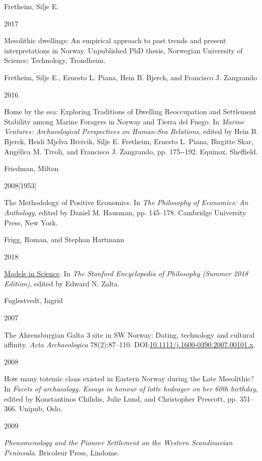 \documentclass[
  12pt,
  a4paper,
  oneside]{book}
\newlength{\cslhangindent}
\newlength{\csllabelwidth}
\newlength{\cslentryspacingunit} %
\newenvironment{CSLReferences}[2] %
 {%
  \setlength{\parindent}{0pt}
  \ifodd #1
  \let\oldpar\par
  \def\par{\hangindent=\cslhangindent\oldpar}
  \fi
  \setlength{\parskip}{#2\cslentryspacingunit}
 }%
 {}
\newcommand{\CSLBlock}[1]{#1\hfill\break}
\newcommand{\CSLLeftMargin}[1]{\parbox[t]{\csllabelwidth}{#1}}
\newcommand{\CSLRightInline}[1]{\parbox[t]{\linewidth - \csllabelwidth}{#1}\break}
\begin{document}
\begin{CSLReferences}{0}{0}
\leavevmode{}%
\CSLBlock{Fretheim, Silje E.}
\CSLLeftMargin{ 2017}
\CSLRightInline{{Mesolithic dwellings: An empirical approach to past trends and present interpretations in Norway}. Unpublished PhD thesis, Norwegian University of Science; Technology, Trondheim.}

\leavevmode{}%
\CSLBlock{Fretheim, Silje E., Ernesto L. Piana, Hein B. Bjerck, and Francisco J. Zangrando}
\CSLLeftMargin{ 2016}
\CSLRightInline{{Home by the sea: Exploring Traditions of Dwelling Reoccupation and Settlement Stability among Marine Foragers in Norway and Tierra del Fuego}. In \emph{{Marine Ventures: Archaeological Perspectives on Human-Sea Relations}}, edited by Hein B. Bjerck, Heidi Mjelva Breivik, Silje E. Fretheim, Ernesto L. Piana, Birgitte Skar, Angélica M. Tivoli, and Francisco J. Zangrando, pp. 175-\/-192. Equinox, Sheffield.}

\leavevmode{}%
\CSLBlock{Friedman, Milton}
\CSLLeftMargin{ 2008{[}1953{]}}
\CSLRightInline{{The Methodology of Positive Economics}. In \emph{{The Philosophy of Economics: An Anthology}}, edited by Daniel M. Hausman, pp. 145--178. Cambridge University Press, New York.}

\leavevmode{}%
\CSLBlock{Frigg, Roman, and Stephan Hartmann}
\CSLLeftMargin{ 2018}
\CSLRightInline{\href{https://plato.stanford.edu/archives/sum2018/entries/models-science/}{{Models in Science}}. In \emph{{The Stanford Encyclopedia of Philosophy (Summer 2018 Edition)}}, edited by Edward N. Zalta.}

\leavevmode{}%
\CSLBlock{Fuglestvedt, Ingrid}
\CSLLeftMargin{ 2007}
\CSLRightInline{{The Ahrensburgian Galta 3 site in SW Norway: Dating, technology and cultural affinity}. \emph{Acta Archaeologica} 78(2):87--110. DOI:\href{https://doi.org/10.1111/j.1600-0390.2007.00101.x}{10.1111/j.1600-0390.2007.00101.x}.}

\leavevmode{}%
\CSLLeftMargin{ 2008 }
\CSLRightInline{{How many totemic clans existed in Eastern Norway during the Late Mesolithic?} In \emph{Facets of archaeology. Essays in honour of lotte hedeager on her 60th birthday}, edited by Konstantinos Chilidis, Julie Lund, and Christopher Prescott, pp. 351--366. Unipub, Oslo.}

\leavevmode{}%
\CSLLeftMargin{ 2009 }
\CSLRightInline{\emph{{Phenomenology and the Pioneer Settlement on the Western Scandinavian Peninsula}}. Bricoleur Press, Lindome.}


\end{CSLReferences}
\end{document}
